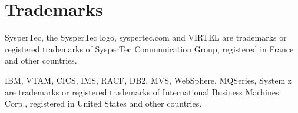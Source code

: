\documentclass[letterpaper,10pt,english]{sphinxmanual}
\begin{document}
\begin{sphinxVerbatim}[commandchars=\\\{\}]
                                                     
 
\end{sphinxVerbatim}


\section{Trademarks}
\label{\detokenize{connectivity_guide:trademarks}}
\sphinxAtStartPar
SysperTec, the SysperTec logo, syspertec.com and VIRTEL are trademarks or registered trademarks of SysperTec
Communication Group, registered in France and other countries.

\sphinxAtStartPar
IBM, VTAM, CICS, IMS, RACF, DB2, MVS, WebSphere, MQSeries, System z are trademarks or registered trademarks of
International Business Machines Corp., registered in United States and other countries.
\end{document}

